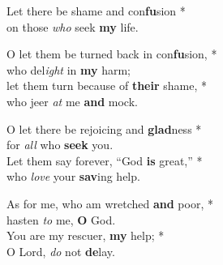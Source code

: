 Let there be shame and con\textbf{fu}sion *\\
on those \emph{who} seek \textbf{my} life. 

O let them be turned back in con\textbf{fu}sion, *\\
who del\emph{ight} in \textbf{my} harm; \\
let them turn because of \textbf{their} shame, *\\
who jeer \emph{at} me \textbf{and} mock. 

O let there be rejoicing and \textbf{glad}ness *\ifnogloria\columnbreak\fi\\
for \emph{all} who \textbf{seek} you. \\
Let them say forever, ``God \textbf{is} great,'' *\\
who \emph{love} your \textbf{sav}ing help. 

As for me, who am wretched \textbf{and} poor, *\\
hasten \emph{to} me, \textbf{O} God. \\
You are my rescuer, \textbf{my} help; *\\
O Lord, \emph{do} not \textbf{de}lay. 
